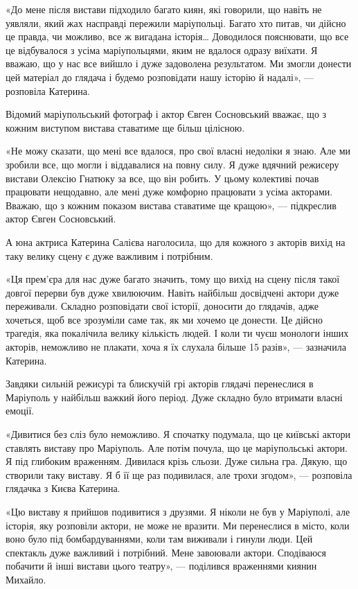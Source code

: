 «До мене після вистави підходило багато киян, які говорили, що навіть не
уявляли, який жах насправді пережили маріупольці. Багато хто питав, чи дійсно
це правда, чи можливо, все ж вигадана історія… Доводилося пояснювати, що все це
відбувалося з усіма маріупольцями, яким не вдалося одразу виїхати. Я вважаю, що
у нас все вийшло і дуже задоволена результатом. Ми змогли донести цей матеріал
до глядача і будемо розповідати нашу історію й надалі», — розповіла Катерина.

Відомий маріупольський фотограф і актор Євген Сосновський вважає, що з кожним
виступом вистава ставатиме ще більш цілісною.

«Не можу сказати, що мені все вдалося, про свої власні недоліки я знаю. Але ми
зробили все, що могли і віддавалися на повну силу. Я дуже вдячний режисеру
вистави Олексію Гнатюку за все, що він робить. У цьому колективі почав
працювати нещодавно, але мені дуже комфорно працювати з усіма акторами. Вважаю,
що з кожним показом вистава ставатиме ще кращою», — підкреслив актор Євген
Сосновський. 

А юна актриса Катерина Салієва наголосила, що для кожного з акторів вихід на
таку велику сцену є дуже важливим і потрібним.

«Ця прем'єра для нас дуже багато значить, тому що вихід на сцену після такої
довгої перерви був дуже хвилюючим. Навіть найбільш досвідчені актори дуже
переживали. Складно розповідати свої історії, доносити до глядачів, адже
хочеться, щоб все зрозуміли саме так, як ми хочемо це донести. Це дійсно
трагедія, яка покалічила велику кількість людей. І коли ти чуєш монологи інших
акторів, неможливо не плакати, хоча я їх слухала більше 15 разів», — зазначила
Катерина.

Завдяки сильній режисурі та блискучій грі акторів глядачі перенеслися в
Маріуполь у найбільш важкий його період. Дуже складно було втримати власні
емоції.

«Дивитися без сліз було неможливо. Я спочатку подумала, що це київські актори
ставлять виставу про Маріуполь. Але потім почула, що це маріупольські актори. Я
під глибоким враженням. Дивилася крізь сльози. Дуже сильна гра. Дякую, що
створили таку виставу. Я б її ще раз подивилася, але трохи згодом», — розповіла
глядачка з Києва Катерина.

«Цю виставу я прийшов подивитися з друзями. Я ніколи не був у Маріуполі, але
історія, яку розповіли актори, не може не вразити. Ми перенеслися в місто, коли
воно було під бомбардуваннями, коли там виживали і гинули люди. Цей спектакль
дуже важливий і потрібний. Мене завоювали актори. Сподіваюся побачити й інші
вистави цього театру», — поділився враженнями киянин Михайло.

